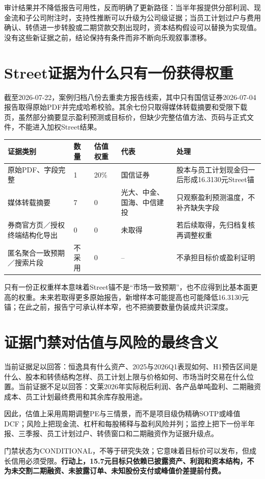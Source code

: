 审计结果并不降低报告可用性，反而明确了更新路径：当半年报提供分部利润、现金流和子公司附注时，支持性推断可以升级为公司级证据；当员工计划过户与费用确认、转债进一步转股或二期贷款交割出现时，资本结构假设可以替换为实现值。没有这些新证据之前，结论保持有条件而非不断向乐观叙事漂移。

\section{Street证据为什么只有一份获得权重}

截至2026-07-22，案例归档八份去重卖方报告线索，其中只有国信证券2026-07-04报告取得原始PDF并完成哈希校验。其余七份只取得媒体转载摘要和受限下载页，虽然部分摘要显示盈利预测或目标价，但缺少完整估值方法、页码与正式文件，不能进入加权Street结果。

\begin{exhibitbox}[卖方证据覆盖与使用上限]
\noindent\begin{tabularx}{\textwidth}{L{3.1cm}R{1.7cm}R{1.8cm}L{2.2cm}X}
\toprule
\textbf{证据类别} & \textbf{数量} & \textbf{估值权重} & \textbf{代表} & \textbf{处理} \\
\midrule
原始PDF、字段完整 & 1 & 20\% & 国信证券 & 股本与员工计划现金归一后形成16.3130元Street锚 \\
媒体转载摘要 & 7 & 0 & 光大、中金、国海、中信建投 & 只观察盈利预测温度，不补齐缺失字段 \\
券商官方页／授权终端结构化导出 & 0 & 0 & 未取得 & 若后续取得，先归档复核再调整权重 \\
匿名聚合一致预期／搜索片段 & 不采用 & 0 & -- & 不承担目标价或盈利证明 \\
\bottomrule
\end{tabularx}
\end{exhibitbox}

只有一份正权重样本意味着Street锚不是“市场一致预期”，也不应得到比基本面更高的权重。未来若取得更多原始报告，新增样本可能提高也可能降低16.3130元锚；在此之前，报告宁可承认样本窄，也不把摘要数量伪装成共识深度。

\section{证据门禁对估值与风险的最终含义}

当前证据足以回答：恒逸具有什么资产、2025与2026Q1表现如何、H1预告区间是什么、股本和转债结构怎样、员工计划上限与价格如何、市场当时交易在什么位置。当前证据不足以回答：文莱2026年实际税后利润、各产品单吨盈利、二期融资成本、员工计划最终费用和其余库存股用途。

因此，估值上采用周期调整PE与三情景，而不是项目级伪精确SOTP或峰值DCF；风险上把现金流、杠杆和每股稀释与盈利风险并列；监控上把下一份半年报、三季报、员工计划过户、转债窗口和二期融资作为证据升级点。

\begin{keyinsight}
门禁状态为CONDITIONAL，不等于研究失效；它意味着目标价可以发布，但成长信用必须受限。\textbf{行动上，15.7元目标只依赖已披露资产、利润和资本结构，不为未交割二期融资、未披露订单、未知股份支付或峰值价差提前付费。}
\end{keyinsight}
